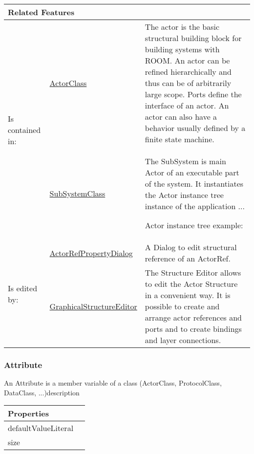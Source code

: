			\vspace{\baselineskip}
			\begingroup
			\renewcommand{\arraystretch}{1.8} %
			\parbox{\textwidth}{
			\begin{longtable}{l l p{}}
				\multicolumn{2}{l}{\textbf{\large Related Features}} & \\
				\hline
			\multirow{2}{*}{Is contained in:} & \tabitem \hyperlink{ref:ActorClass}{ActorClass}  & The actor is the basic structural building block for building systems with ROOM. An actor can be refined hierarchically and thus can be of arbitrarily large scope. Ports define the interface of an actor. An actor can also have a behavior usually defined by a finite state machine. \\
			& \tabitem \hyperlink{ref:SubSystemClass}{SubSystemClass}  & The SubSystem is main Actor of an executable part of the system. It instantiates the Actor instance tree instance of the application ...
				
				Actor instance tree example:
				 \\
			\hline
			\multirow{2}{*}{Is edited by:} & \tabitem \hyperlink{ref:ActorRefPropertyDialog}{ActorRefPropertyDialog}  & 
					A Dialog to edit structural reference of an ActorRef.
				\\
			& \tabitem \hyperlink{ref:GraphicalStructureEditor}{GraphicalStructureEditor}  & The Structure Editor allows to edit the Actor Structure in a convenient way. It is possible to create and arrange actor references and ports and to create bindings and layer connections. \\
			\hline
			\end{longtable}	
			}
			\endgroup
			\vspace{\baselineskip}
			
			
		
		\subsubsection{Attribute}
			\hypertarget{ref:Attribute}{}
			
			An Attribute is a member variable of a class (ActorClass, ProtocolClass, DataClass, ...)description 
			
			\vspace{\baselineskip}
			\begingroup
			\renewcommand{\arraystretch}{1.8} %
			\parbox{\textwidth}{
			\begin{longtable}{l p{}}
				\multicolumn{2}{l}{\textbf{\large Properties}} \\
				\hline
			\tabitem defaultValueLiteral & \\
			\tabitem size & \\
			\end{longtable}	
			}
			\endgroup
			\vspace{\baselineskip}
			
